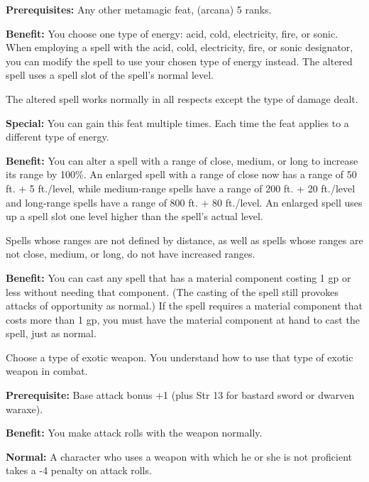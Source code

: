
\textbf{Prerequisites:} Any other metamagic feat,  (arcana) 5 ranks.

\textbf{Benefit:} You choose one type of energy: acid, cold, electricity, fire, 
or sonic. When employing a spell with the acid, cold, electricity, fire, or sonic 
designator, you can modify the spell to use your chosen type of energy instead. 
The altered spell uses a spell slot of the spell's normal level.

The altered spell works normally in all respects except the type of damage dealt. 

\textbf{Special:} You can gain this feat multiple times. Each time the feat applies 
to a different type of energy.


\textbf{Benefit:} You can alter a spell with a range of close, medium, or long 
to increase its range by 100\%. An enlarged spell with a range of close now has 
a range of 50 ft. + 5 ft./level, while medium-range spells have a range of 200 
ft. + 20 ft./level and long-range spells have a range of 800 ft. + 80 ft./level. 
An enlarged spell uses up a spell slot one level higher than the spell's actual 
level.

Spells whose ranges are not defined by distance, as well as spells whose ranges 
are not close, medium, or long, do not have increased ranges.


\textbf{Benefit:} You can cast any spell that has a material component costing 
1 gp or less without needing that component. (The casting of the spell still provokes 
attacks of opportunity as normal.) If the spell requires a material component that 
costs more than 1 gp, you must have the material component at hand to cast the 
spell, just as normal.


Choose a type of exotic weapon. You understand how to use that type of exotic weapon 
in combat.

\textbf{Prerequisite:} Base attack bonus +1 (plus Str 13 for bastard sword or dwarven 
waraxe).

\textbf{Benefit:} You make attack rolls with the weapon normally.

\textbf{Normal:} A character who uses a weapon with which he or she is not proficient 
takes a -4 penalty on attack rolls.

